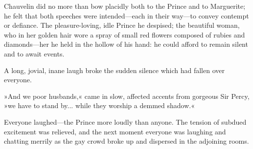 Chauvelin did no more than bow placidly both to the Prince and to Marguerite; he felt that both speeches were intended\allowbreak---\allowbreak each in their way\allowbreak---\allowbreak to convey contempt or defiance. The pleasure-loving, idle Prince he despised; the beautiful woman, who in her golden hair wore a spray of small red flowers composed of rubies and diamonds\allowbreak---\allowbreak her he held in the hollow of his hand: he could afford to remain silent and to await events.

A long, jovial, inane laugh broke the sudden silence which had fallen over everyone.

»And we poor husbands,« came in slow, affected accents from gorgeous Sir Percy, »we have to stand by... while they worship a demmed shadow.«

Everyone laughed\allowbreak---\allowbreak the Prince more loudly than anyone. The tension of subdued excitement was relieved, and the next moment everyone was laughing and chatting merrily as the gay crowd broke up and dispersed in the adjoining rooms.